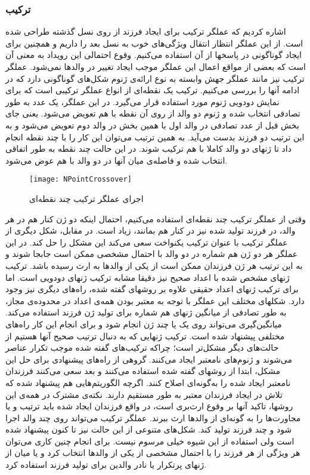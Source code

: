 \documentclass{report}
\begin{document}
\subsubsection{ترکیب}
اشاره کردیم که عملگر ترکیب برای ایجاد فرزند از روی نسل گذشته طراحی شده است. از این عملگر انتظار انتقال ويژگی‌های خوب به نسل بعد را داریم و همچنین برای ایجاد گوناگونی در پاسخها از آن استفاده می‌کنیم. وقوع احتمالی این رویداد به معنی آن است که بعضی از مواقع اعمال این عملگر موجب ایجاد تغییر در والدها نمی‌شود. عملگر ترکیب نیز مانند عملگر جهش وابسته به نوع ارائه‌ی ژنوم شکل‌های گوناگونی دارد که در ادامه آنها را بررسی می‌کنیم.
ترکیب یک نقطه‌ای از انواع عملگر ترکیبی است که برای نمایش دودویی ژنوم مورد استفاده قرار می‌گیرد. در این عملگر، یک عدد به طور تصادفی انتخاب شده و ژنوم دو والد از روی آن نقطه با هم تعویض می‌شود. یعنی جای بخش قبل از عدد تصادفی در والد اول با همین بخش در والد دوم تعویض می‌شود و به این ترتیب دو فرزند بدست می‌آید. به همین ترتیب می‌توان این کار را با چند نقطه انجام داد تا ژنهای دو والد کاملا با هم ترکیب شوند. در این حالت چند نقطه به طور اتفاقی انتخاب شده و فاصله‌ی میان آنها در دو والد با هم عوض می‌شود.
\begin{figure}[h] \centerline{\texttt{[image: NPointCrossover]}} \caption{\label{fNPointCrossover}
 اجرای عملگر ترکیب چند نقطه‌ای
 } \end{figure}
وقتی از عملگر ترکیب چند نقطه‌ای استفاده می‌کنیم، احتمال اینکه دو ژن کنار هم در هر والد، در فرزند تولید شده نیز در کنار هم بمانند، زیاد است. در مقابل، شکل دیگری از عملگر ترکیب با عنوان ترکیب یکنواخت سعی می‌کند این مشکل را حل کند. در این عملگر هر دو ژن هم شماره در دو والد با احتمال مشخصی ممکن است جابجا شوند و به این ترتیب هر ژن فرزندان ممکن است از یکی از والدها به ارث رسیده باشد.
ترکیب ژنهای مشخص شده با اعداد صحیح نیز دقیقا مشابه ترکیب ژنهای دودویی است. اما برای ترکیب ژنهای اعداد حقیقی علاوه بر روشهای گفته شده، راه‌های دیگری نیز وجود دارد. شکلهای مختلف این عملگر با توجه به معتبر بودن همه‌ی اعداد در محدوده‌ی مجاز، به طور تصادفی از میانگین ژنهای هم شماره برای تولید ژن فرزند استفاده می‌کند. میانگین‌گیری می‌تواند روی یک یا چند ژن انجام شود و برای انجام این کار راه‌های مختلفی پیشنهاد شده است.
ترکیب ژنهایی که به دنبال ترتیب صحیح آنها هستیم از حالت‌های دیگر مشکل‌تر است؛ چراکه ترکیب‌های گفته شده موجب تکرار عناصر می‌شوند و ژنوم‌های نامعتبر ایجاد می‌کنند. گروهی از راه‌های پیشنهادی برای حل این مشکل، ابتدا از روشهای گفته شده استفاده می‌کنند و بعد سعی می‌کنند فرزندان نامعتبر ایجاد شده را به‌گونه‌ای اصلاح کنند. اگرچه الگوریتم‌هایی هم پیشنهاد شده که تلاش در ایجاد فرزندان معتبر به طور مستقیم دارند. نکته‌ی مشترک در همه‌ی این روشها، تاکید آنها بر وقوع ارث‌بری است، در واقع فرزندان ایجاد شده باید ترتیب و یا مجاورت‌ها را به گونه‌ای از والد‌ها ارث ببرند.
عملگر ترکیب می‌تواند روی چند والد اجرا شود و چند فرزند تولید کند. شکل‌های متنوعی از این حالت نیز تا کنون پیشنهاد شده است ولی استفاده از این شیوه خیلی مرسوم نیست. برای انجام چنین کاری می‌توان هر ویژگی از هر فرزند را با احتمال مشخصی از یکی از والدها انتخاب کرد و یا میان از ژنهای پرتکرار یا نادر والدین برای تولید فرزند استفاده کرد.
\end{document}
